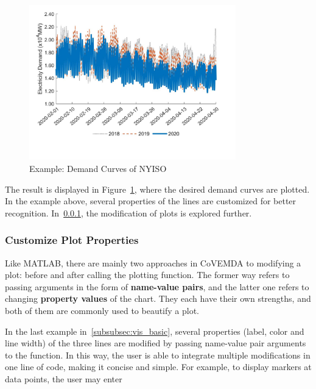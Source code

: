 \documentclass[11pt]{article}
\newcommand{\covemda}{CoVEMDA}
\newcommand{\matlab}{\textsc{MATLAB}}
\numberwithin{equation}{section}
\numberwithin{table}{section}
\numberwithin{figure}{section}
\begin{document}

\begin{figure}
  \centering
  \noindent\includegraphics[width=0.8\textwidth]{figures/visualization_example4.jpg}
  \caption{Example: Demand Curves of NYISO} \label{fig:vis_eg4}
\end{figure}

The result is displayed in Figure~\ref{fig:vis_eg4}, where the desired demand curves are plotted. In the example above, several properties of the lines are customized for better recognition. In~\ref{subsubsec:vis_cus}, the modification of plots is explored further.



\subsubsection{Customize Plot Properties} \label{subsubsec:vis_cus}

Like \matlab{}, there are mainly two approaches in \covemda{} to modifying a plot: before and after calling the plotting function. The former way refers to passing arguments in the form of \textbf{name-value pairs}, and the latter one refers to changing \textbf{property values} of the chart. They each have their own strengths, and both of them are commonly used to beautify a plot.

In the last example in~\ref{subsubsec:vis_basic}, several properties (label, color and line width) of the three lines are modified by passing name-value pair arguments to the function. In this way, the user is able to integrate multiple modifications in one line of code, making it concise and simple. For example, to display markers at data points, the user may enter
\end{document}
